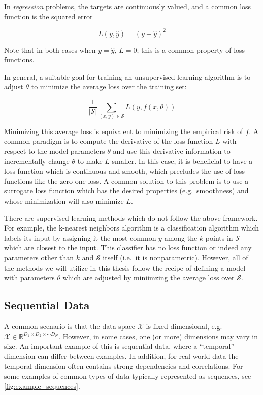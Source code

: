 In {\em regression} problems, the targets are continuously valued, and a common loss function is the squared error

\begin{equation}
L(y, \hat{y}) = (y - \hat{y})^2
\end{equation}

Note that in both cases when $y = \hat{y}$, $L = 0$; this is a common property of loss functions.

In general, a suitable goal for training an unsupervised learning algorithm is to adjust $\theta$ to minimize the average loss over the training set:

\begin{equation}
\frac{1}{|\mathcal{S}|} \sum_{(x, y) \in \mathcal{S}} L(y, f(x, \theta))
\end{equation}

Minimizing this average loss is equivalent to minimizing the empirical risk of $f$.
A common paradigm is to compute the derivative of the loss function $L$ with respect to the model parameters $\theta$ and use this derivative information to incrementally change $\theta$ to make $L$ smaller.
In this case, it is beneficial to have a loss function which is continuous and smooth, which precludes the use of loss functions like the zero-one loss.
A common solution to this problem is to use a surrogate loss function which has the desired properties (e.g.\ smoothness) and whose minimization will also minimize $L$.

There are supervised learning methods which do not follow the above framework.
For example, the k-nearest neighbors algorithm is a classification algorithm which labels its input by assigning it the most common $y$ among the $k$ points in $\mathcal{S}$ which are closest to the input.
This classifier has no loss function or indeed any parameters other than $k$ and $\mathcal{S}$ itself (i.e.\ it is nonparametric).
However, all of the methods we will utilize in this thesis follow the recipe of defining a model with parameters $\theta$ which are adjusted by miniimzing the average loss over $\mathcal{S}$.

\subsection{Sequential Data}

A common scenario is that the data space $\mathcal{X}$ is fixed-dimensional, e.g.\ $\mathcal{X} \in \mathbb{R}^{D_1 \times D_2 \times \cdots D_N}$.
However, in some cases, one (or more) dimensions may vary in size.
An important example of this is sequential data, where a ``temporal'' dimension can differ between examples.
In addition, for real-world data the temporal dimension often contains strong dependencies and correlations.
For some examples of common types of data typically represented as sequences, see \cref{fig:example_sequences}.

